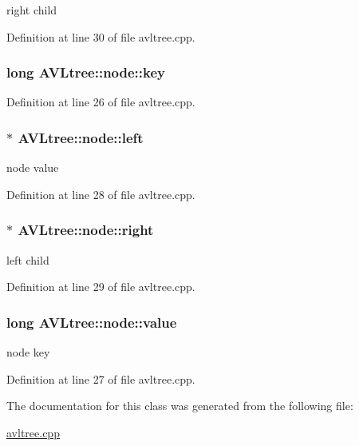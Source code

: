 right child 



Definition at line 30 of file avltree.\-cpp.

\hypertarget{class_a_v_ltree_1_1node_af9249c77ccf64046f71f61ec7e9cf3f4}{
\subsubsection[{key}]{\setlength{\rightskip}{0pt plus 5cm}long A\-V\-Ltree\-::node\-::key}}\label{class_a_v_ltree_1_1node_af9249c77ccf64046f71f61ec7e9cf3f4}


Definition at line 26 of file avltree.\-cpp.

\hypertarget{class_a_v_ltree_1_1node_a619a5dd3401226e2488ce3d4c757f2ba}{
\subsubsection[{left}]{$\ast$ A\-V\-Ltree\-::node\-::left}}\label{class_a_v_ltree_1_1node_a619a5dd3401226e2488ce3d4c757f2ba}


node value 



Definition at line 28 of file avltree.\-cpp.

\hypertarget{class_a_v_ltree_1_1node_ae806bff5f1dbc868ee3a1f6bd5fdf59d}{
\subsubsection[{right}]{$\ast$ A\-V\-Ltree\-::node\-::right}}\label{class_a_v_ltree_1_1node_ae806bff5f1dbc868ee3a1f6bd5fdf59d}


left child 



Definition at line 29 of file avltree.\-cpp.

\hypertarget{class_a_v_ltree_1_1node_ad193d6c64cf315f35c953f1e19830a6a}{
\subsubsection[{value}]{\setlength{\rightskip}{0pt plus 5cm}long A\-V\-Ltree\-::node\-::value}}\label{class_a_v_ltree_1_1node_ad193d6c64cf315f35c953f1e19830a6a}


node key 



Definition at line 27 of file avltree.\-cpp.



The documentation for this class was generated from the following file\-:\begin{DoxyCompactItemize}
\item 
\hyperlink{avltree_8cpp}{avltree.\-cpp}\end{DoxyCompactItemize}
